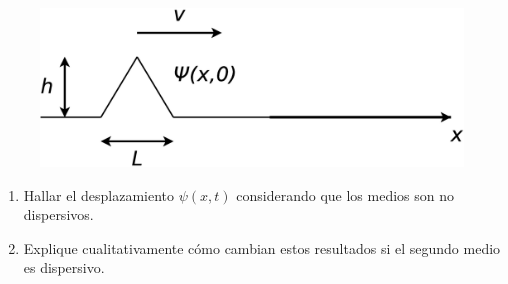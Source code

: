 \documentclass[11pt,spanish]{article}
\begin{document}
\begin{enumerate}
	\begin{figure}[H]
		\centering{}\includegraphics[clip,scale=0.25]{figs/ej2-20}
	\end{figure}

	\begin{enumerate}
		\item Hallar el desplazamiento $\psi(x,t)$ considerando que los medios
    	son no dispersivos.

		\item Explique cualitativamente cómo cambian estos resultados si el
        segundo medio es dispersivo.
	\end{enumerate}
    
\end{enumerate}
\end{document}
